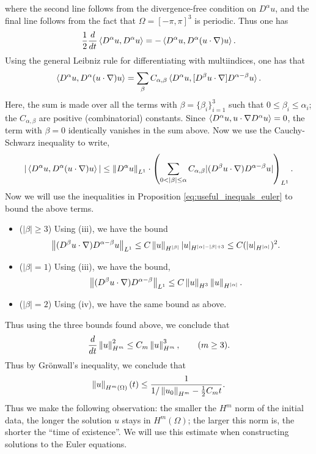 \documentclass{article}
\begin{document}
where the second line follows from the divergence-free condition on $D^{\alpha}u$, and the final line follows from the fact that $\Omega = [-\pi,\pi]^{3}$ is periodic. Thus one has 
\begin{equation*}
	\frac{1}{2}\frac{d}{dt}\braket{D^{\alpha}u,D^{\alpha}u} = -\braket{D^{\alpha}u,D^{\alpha}(u \cdot \nabla)u}. 
\end{equation*}
Using the general Leibniz rule for differentiating with multiindices, one has that 
\begin{equation*}
	\braket{D^{\alpha}u, D^{\alpha}(u \cdot \nabla)u} = \sum_{\beta}C_{\alpha,\beta}\braket{D^{\alpha}u, [D^{\beta}u \cdot \nabla]D^{\alpha - \beta}u}. 
\end{equation*}
Here, the sum is made over all the terms with $\beta = \{\beta_{i}\}_{i =1 }^{3}$ such that $0 \leq \beta_{i} \leq \alpha_{i}$; the $C_{\alpha,\beta}$ are positive (combinatorial) constants. Since $\braket{D^{\alpha}u, u \cdot \nabla D^{\alpha}u} = 0$, the term with $\beta = 0$ identically vanishes in the sum above. Now we use the Cauchy-Schwarz inequality to write, 
\begin{equation*}
	|\braket{D^{\alpha}u, D^{\alpha}(u \cdot \nabla)u}| \leq \left\Vert D^{\alpha}u \right\Vert_{L^{1}} \cdot \left(\sum_{0 < |\beta|\leq \alpha}C_{\alpha,\beta}|(D^{\beta}u \cdot \nabla)D^{\alpha -\beta}u|\right)_{L^{1}}. 
\end{equation*} 
Now we will use the inequalities in Proposition \ref{eq:useful_inequals_euler} to bound the above terms. \vspace{-0.25cm}
\begin{itemize}[itemsep =-2pt]
	\item ($|\beta| \geq 3$) Using (iii), we have the bound 
	\begin{equation*}
		\left\Vert (D^{\beta}u \cdot \nabla)D^{\alpha - \beta}u \right\Vert_{L^{1}} \leq C \left\Vert u \right\Vert_{H^{|\beta|}}|u|_{H^{|\alpha| - |\beta| + 3}} \leq C(|u|_{H^{|\alpha|}})^{2}. 
	\end{equation*}
	\item ($|\beta| = 1$) Using (iii), we have the bound, 
	\begin{equation*}
		\left\Vert (D^{\beta}u \cdot \nabla)D^{\alpha - \beta} \right\Vert_{L^{1}} \leq C\left\Vert u \right\Vert_{H^{3}}\left\Vert u \right\Vert_{H^{|\alpha|}}. 
	\end{equation*}
	\item ($|\beta| = 2$) Using (iv), we have the same bound as above. 
\end{itemize}
Thus using the three bounds found above, we conclude that 
\begin{equation*}
	\frac{d}{dt}\left\Vert u \right\Vert_{H^{m}}^{2} \leq C_{m}\left\Vert u \right\Vert_{H^{m}}^{3}, \qquad (m \geq 3). 
\end{equation*}
Thus by Gr\"onwall's inequality, we conclude that 
\begin{equation*}
	\left\Vert u \right\Vert_{H^{m}(\Omega)}(t) \leq \frac{1}{1/\left\Vert u_{0} \right\Vert_{H^{m}} - \frac{1}{2}C_{m}t}. 
\end{equation*}
Thus we make the following observation: the smaller the $H^{m}$ norm of the initial data, the longer the solution $u$ stays in $H^{m}(\Omega)$; the larger this norm is, the shorter the ``time of existence''. We will use this estimate when constructing solutions to the Euler equations. 
\end{document}
